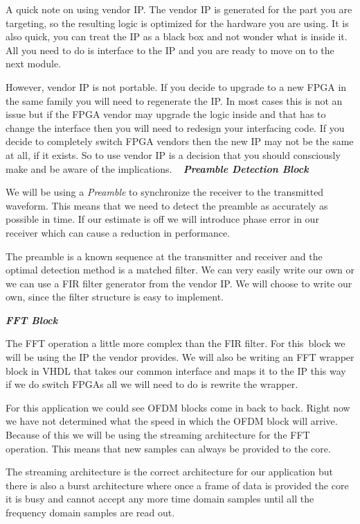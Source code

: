 A quick note on using vendor \ac{IP}. The vendor \ac{IP} is generated for the part you are targeting, so the resulting logic is optimized for the hardware you are using. It is also quick, you can treat the \ac{IP} as a black box and not wonder what is inside it. All you need to do is interface to the \ac{IP} and you are ready to move on to the next module.

However, vendor \ac{IP} is not portable. If you decide to upgrade to a new \ac{FPGA} in the same family you will need to regenerate the \ac{IP}. In most cases this is not an issue but if the \ac{FPGA} vendor may upgrade the logic inside and that has to change the interface then you will need to redesign your interfacing code. If you decide to completely switch \ac{FPGA} vendors then the new \ac{IP} may not be the same at all, if it exists. So to use vendor \ac{IP} is a decision that you should consciously make and be aware of the implications. 
 
{\bf \emph{Preamble Detection Block}}

We will be using a \emph{Preamble} to synchronize the receiver to the transmitted waveform. This means that we need to detect the preamble as accurately as possible in time. If our estimate is off we will introduce phase error in our receiver which can cause a reduction in performance.

The preamble is a known sequence at the transmitter and receiver and the optimal detection method is a matched filter. We can very easily write our own or we can use a \ac{FIR} filter generator from the vendor \ac{IP}. We will choose to write our own, since the filter structure is easy to implement.

{\bf \emph{\ac{FFT} Block}}

The \ac{FFT} operation a little more complex than the \ac{FIR} filter. For this block we will be using the \ac{IP} the vendor provides. We will also be writing an \ac{FFT} wrapper block in \ac{VHDL} that takes our common interface and maps it to the \ac{IP} this way if we do switch \ac{FPGA}s all we will need to do is rewrite the wrapper.

For this application we could see \ac{OFDM} blocks come in back to back. Right now we have not determined what the speed in which the \ac{OFDM} block will arrive. Because of this we will be using the streaming architecture for the \ac{FFT} operation. This means that new samples can always be provided to the core.

The streaming architecture is the correct architecture for our application but there is also a burst architecture where once a frame of data is provided the core it is busy and cannot accept any more time domain samples until all the frequency domain samples are read out.

